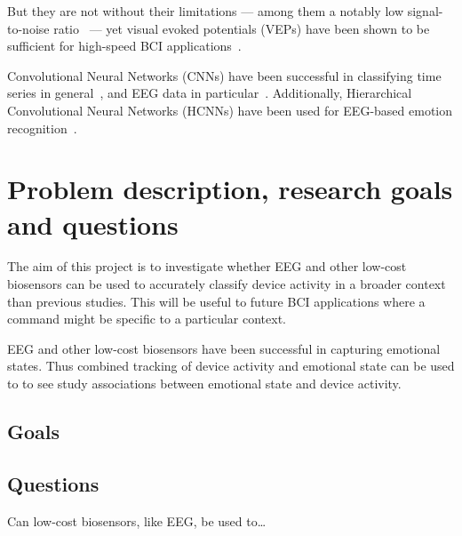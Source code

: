 \documentclass{IEEEtran}
\begin{document}
But they are not without their limitations --- among them a notably low signal-to-noise ratio~\cite{mcfarland_eeg-based_2017} --- yet visual evoked potentials (VEPs) have been shown to be sufficient for high-speed BCI applications~\cite{spuler_high-speed_2017}.


Convolutional Neural Networks (CNNs) have been successful in classifying time series in general~\cite{zhao_convolutional_2017}, and EEG data in particular~\cite{schirrmeister_deep_2017}. Additionally, Hierarchical Convolutional Neural Networks (HCNNs) have been used for EEG-based emotion recognition~\cite{li_hierarchical_2018}.


\section{Problem description, research goals and questions}

The aim of this project is to investigate whether EEG and other low-cost biosensors can be used to accurately classify device activity in a broader context than previous studies. This will be useful to future BCI applications where a command might be specific to a particular context.

EEG and other low-cost biosensors have been successful in capturing emotional states. Thus combined tracking of device activity and emotional state can be used to to see study associations between emotional state and device activity. %

\subsection{Goals}



\subsection{Questions}

Can low-cost biosensors, like EEG, be used to\ldots
\end{document}

